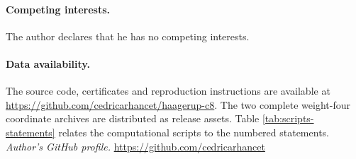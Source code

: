 \documentclass[leqno]{article}
\numberwithin{equation}{section}
\begin{document}
\paragraph{Competing interests.} The author declares that he has no competing interests.

\paragraph{Data availability.}
The source code, certificates and reproduction instructions are available at \url{https://github.com/cedricarhancet/haagerup-c8}. The two complete weight-four coordinate archives are distributed as release assets. Table \ref{tab:scripts-statements} relates the computational scripts to the numbered statements.
\noindent\textit{Author's GitHub profile.} \url{https://github.com/cedricarhancet}
\end{document}
